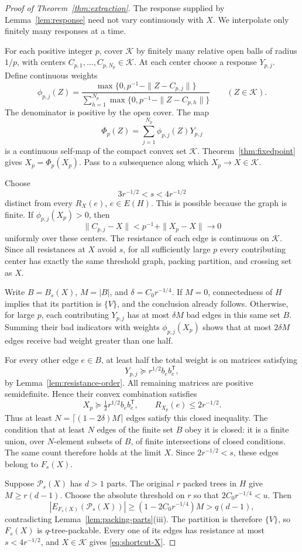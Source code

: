 \documentclass[11pt]{amsart}
\theoremstyle{definition}
\theoremstyle{remark}
\numberwithin{equation}{section}
\begin{document}
\begin{proof}[Proof of Theorem~\ref{thm:extraction}]
The response supplied by Lemma~\ref{lem:response} need not vary
continuously with \(X\). We interpolate only finitely many responses
at a time.

For each positive integer \(p\), cover \(\mathcal K\) by finitely
many relative open balls of radius \(1/p\), with centers
\(C_{p,1},\ldots,C_{p,N_p}\in\mathcal K\). At each center choose a
response \(Y_{p,j}\). Define continuous weights
\[
 \phi_{p,j}(Z)=
 \frac{\max\{0,p^{-1}-\|Z-C_{p,j}\|\}}
 {\sum_{h=1}^{N_p}\max\{0,p^{-1}-\|Z-C_{p,h}\|\}}
 \qquad(Z\in\mathcal K).
\]
The denominator is positive by the open cover.
The map
\[
 \Phi_p(Z)=\sum_{j=1}^{N_p}\phi_{p,j}(Z)Y_{p,j}
\]
is a continuous self-map of the compact convex set \(\mathcal K\).
Theorem~\ref{thm:fixedpoint} gives
\(X_p=\Phi_p(X_p)\).
Pass to a subsequence along which \(X_p\to X\in\mathcal K\).

Choose
\[
 3r^{-1/2}<s<4r^{-1/2}
\]
distinct from every \(R_X(e)\), \(e\in E(H)\).
This is possible because the graph is finite.
If \(\phi_{p,j}(X_p)>0\), then
\[
 \|C_{p,j}-X\|<p^{-1}+\|X_p-X\|\longrightarrow0
\]
uniformly over these centers. The resistance of each edge is
continuous on \(\mathcal K\). Since all resistances at \(X\) avoid
\(s\), for all sufficiently large \(p\) every contributing center
has exactly the same threshold graph, packing partition, and
crossing set as \(X\).

Write \(B=B_s(X)\), \(M=|B|\), and
\(\delta=C_0r^{-1/4}\). If \(M=0\), connectedness of \(H\) implies
that its partition is \(\{V\}\), and the conclusion already follows.
Otherwise, for large \(p\), each contributing \(Y_{p,j}\) has at
most \(\delta M\) bad edges in this same set \(B\).
Summing their bad indicators with weights \(\phi_{p,j}(X_p)\)
shows that at most \(2\delta M\) edges receive bad weight greater
than one half.

For every other edge \(e\in B\), at least half the total weight is
on matrices satisfying
\[
 Y_{p,j}\succeq r^{1/2}b_eb_e^{\mathsf T},
\]
by Lemma~\ref{lem:resistance-order}. All remaining matrices are
positive semidefinite. Hence their convex combination satisfies
\[
 X_p\succeq\tfrac12r^{1/2}b_eb_e^{\mathsf T},
 \qquad R_{X_p}(e)\le2r^{-1/2}.
\]
Thus at least \(N=\lceil(1-2\delta)M\rceil\) edges satisfy this
closed inequality. The condition that at least \(N\) edges of the
finite set \(B\) obey it is closed: it is a finite union, over
\(N\)-element subsets of \(B\), of finite intersections of closed
conditions.
The same count therefore holds at the limit \(X\).
Since \(2r^{-1/2}<s\), these edges belong to \(F_s(X)\).

Suppose \(\mathcal P_s(X)\) has \(d>1\) parts.
The original \(r\) packed trees in \(H\) give \(M\ge r(d-1)\).
Choose the absolute threshold on \(r\) so that
\(2C_0r^{-1/4}<u\). Then
\[
 |E_{F_s(X)}(\mathcal P_s(X))|
 \ge(1-2C_0r^{-1/4})M
 >q(d-1),
\]
contradicting Lemma~\ref{lem:packing-parts}(iii).
The partition is therefore \(\{V\}\), so \(F_s(X)\) is
\(q\)-tree-packable. Every one of its edges has resistance at most
\(s<4r^{-1/2}\), and \(X\in\mathcal K\) gives
\eqref{eq:shortcut-X}.
\end{proof}
\end{document}
